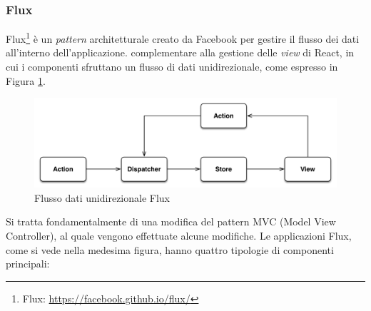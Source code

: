 \subsubsection{Flux}\label{sec:flux}

Flux\footnote{Flux: \url{https://facebook.github.io/flux/}} è un \emph{pattern} architetturale creato da Facebook per gestire il flusso dei dati all'interno dell'applicazione. \upe complementare alla gestione delle \emph{view} di React, in cui i componenti sfruttano un flusso di dati unidirezionale, come espresso in Figura \ref{fig:flux}.

\begin{figure}[ht]
	\centering
	\includegraphics[width=\textwidth]{6-implementazione-app/immagini/flux.png}
	\caption{Flusso dati unidirezionale Flux}\label{fig:flux}
\end{figure}

Si tratta fondamentalmente di una modifica del pattern MVC (Model View Controller), al quale vengono effettuate alcune modifiche.
Le applicazioni Flux, come si vede nella medesima figura, hanno quattro tipologie di componenti principali:

